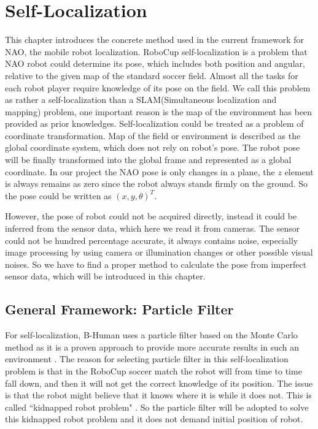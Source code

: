 \chapter{Self-Localization}\label{Chap:PF}
This chapter introduces the concrete method used in the current framework for NAO, the mobile robot localization. RoboCup self-localization is a problem that NAO robot could determine its pose, which includes both position and angular, relative to the given map of the standard soccer field. Almost all the tasks for each robot player require knowledge of its pose on the field. We call this problem as rather a self-localization than a SLAM(Simultaneous localization and mapping) problem, one important reason is the map of the environment has been provided as prior knowledges. Self-localization could be treated as a problem of coordinate transformation. Map of the field or environment is described as the global coordinate system, which does not rely on robot's pose. The robot pose will be finally transformed into the global frame and represented as a global coordinate\cite{thrun2005probabilistic}. In our project the NAO pose is only changes in a plane, the $z$ element is always remains as zero since the robot always stands firmly on the ground. So the pose could be written as $(x,y,\theta)^T$.

However, the pose of robot could not be acquired directly, instead it could be inferred from the sensor data, which here we read it from cameras. The sensor could not be hundred percentage accurate, it always contains noise, especially image processing by using camera or illumination changes or other possible visual noises. So we have to find a proper method to calculate the pose from imperfect sensor data, which will be introduced in this chapter.

\section{General Framework: Particle Filter}
For self-localization, B-Human uses a particle filter based on the Monte Carlo method \cite{fox1999monte} as it is a proven approach to provide more accurate results in such an environment \cite{rofer2005particle}. The reason for selecting particle filter in this self-localization problem is that in the RoboCup soccer match the robot will from time to time fall down, and then it will not get the correct knowledge of its position. The issue is that the robot might believe that it knows where it is while it does not. This is called ``kidnapped robot problem" \cite{thrun2005probabilistic}. So the particle filter will be adopted to solve this kidnapped robot problem and it does not demand initial position of robot.

